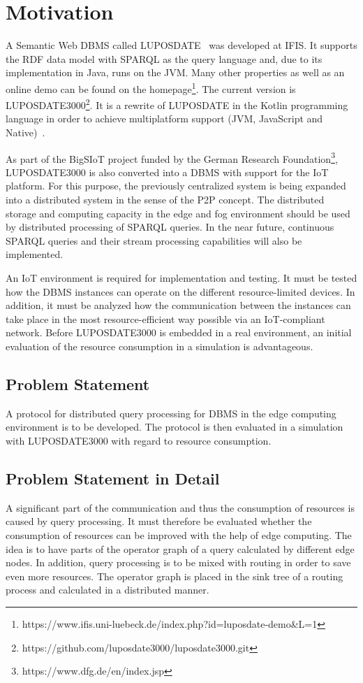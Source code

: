 \documentclass[english,version-2019-11]{uzl-thesis}
\begin{document}
\section{Motivation}
A Semantic Web DBMS called LUPOSDATE~\cite{SWBook} was developed at IFIS. It supports the RDF data model with SPARQL as the query language and, due to its implementation in Java, runs on the JVM. Many other properties as well as an online demo can be found on the homepage\footnote{https://www.ifis.uni-luebeck.de/index.php?id=luposdate-demo\&L=1}.
The current version is LUPOSDATE3000\footnote{https://github.com/luposdate3000/luposdate3000.git}.
It is a rewrite of LUPOSDATE in the Kotlin programming language in order to achieve multiplatform support (JVM, JavaScript and Native)~\cite{Warnke21Flexible}.

As part of the BigSIoT project funded by the German Research Foundation\footnote{https://www.dfg.de/en/index.jsp}, LUPOSDATE3000 is also converted into a DBMS with support for the IoT platform. For this purpose, the previously centralized system is being expanded into a distributed system in the sense of the P2P concept. The distributed storage and computing capacity in the edge and fog environment should be used by distributed processing of SPARQL queries. In the near future, continuous SPARQL queries and their stream processing capabilities will also be implemented.

An IoT environment is required for implementation and testing. It must be tested how the DBMS instances can operate on the different resource-limited devices. In addition, it must be analyzed how the communication between the instances can take place in the most resource-efficient way possible via an IoT-compliant network. Before LUPOSDATE3000 is embedded in a real environment, an initial evaluation of the resource consumption in a simulation is advantageous.
\subsection{Problem Statement}
A protocol for distributed query processing for DBMS in the edge computing environment is to be developed. The protocol is then evaluated in a simulation with LUPOSDATE3000 with regard to resource consumption.

\subsection{Problem Statement in Detail}
A significant part of the communication and thus the consumption of resources is caused by query processing. It must therefore be evaluated whether the consumption of resources can be improved with the help of edge computing. The idea is to have parts of the operator graph of a query calculated by different edge nodes. In addition, query processing is to be mixed with routing in order to save even more resources. The operator graph is placed in the sink tree of a routing process and calculated in a distributed manner.
\end{document}
